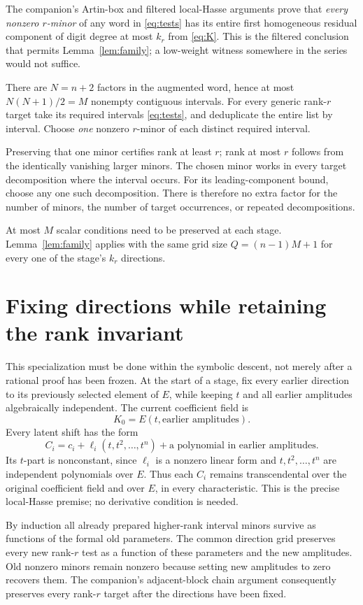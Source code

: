 The companion's Artin-box and filtered local-Hasse arguments prove
that \emph{every nonzero $r$-minor} of any word in \eqref{eq:tests}
has its entire first homogeneous residual component of digit degree
at most $k_r$ from \eqref{eq:K}. This is the filtered conclusion that
permits Lemma~\ref{lem:family}; a low-weight witness somewhere in the
series would not suffice.

There are $N=n+2$ factors in the augmented word, hence at most
$N(N+1)/2=M$ nonempty contiguous intervals. For every generic
rank-$r$ target take its required intervals \eqref{eq:tests}, and
deduplicate the entire list by interval. Choose \emph{one} nonzero
$r$-minor of each distinct required interval.

Preserving that one minor certifies rank at least $r$; rank at most
$r$ follows from the identically vanishing larger minors. The chosen
minor works in every target decomposition where the interval occurs.
For its leading-component bound, choose any one such decomposition.
There is therefore no extra factor for the number of minors, the
number of target occurrences, or repeated decompositions.

At most $M$ scalar conditions need to be preserved at each stage.
Lemma~\ref{lem:family} applies with the same grid size
$Q=(n-1)M+1$ for every one of the stage's $k_r$ directions.

\section{Fixing directions while retaining the rank invariant}

This specialization must be done within the symbolic descent, not
merely after a rational proof has been frozen. At the start of a
stage, fix every earlier direction to its previously selected element
of $E$, while keeping $t$ and all earlier amplitudes algebraically
independent. The current coefficient field is
\[
 K_0=E(t,\text{earlier amplitudes}).
\]
Every latent shift has the form
\[
 C_i=c_i+\ell_i(t,t^2,\ldots,t^n)
               +\text{a polynomial in earlier amplitudes}.
\]
Its $t$-part is nonconstant, since $\ell_i$ is a nonzero linear form
and $t,t^2,\ldots,t^n$ are independent polynomials over $E$.
Thus each $C_i$ remains transcendental over the original coefficient
field and over $E$, in every characteristic. This is the precise
local-Hasse premise; no derivative condition is needed.

By induction all already prepared higher-rank interval minors survive
as functions of the formal old parameters. The common direction grid
preserves every new rank-$r$ test as a function of these parameters
and the new amplitudes. Old nonzero minors remain nonzero because
setting new amplitudes to zero recovers them. The companion's
adjacent-block chain argument consequently preserves every rank-$r$
target after the directions have been fixed.

